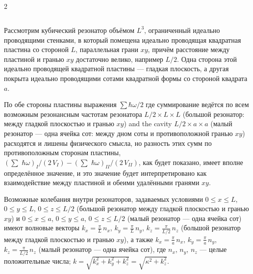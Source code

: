 \documentclass[twoside, 10pt]{article}
\def\myvspacebeforesubsection{-2.0mm}
\def\myvspaceaftersubsection{-2.5mm}
\begin{document}
\begin{multicols}{2}
\vspace{\myvspacebeforesubsection}
    \subsection*{} \label{two-dimensional-casimirs-approach}
\vspace{\myvspaceaftersubsection}


    Рассмотрим кубический резонатор объёмом \(L^3\), ограниченный идеально
проводящими стенками, в который помещена идеально проводящая квадратная пластина со стороной
\(L\), параллельная грани \(xy\), причём расстояние между пластиной и гранью \(xy\)
достаточно велико, например \(L/2\).
Одна сторона этой идеально проводящей квадратной пластины — гладкая плоскость, а
другая покрыта идеально проводящими сотами квадратной формы со стороной квадрата \(a\).

По обе стороны пластины выражения \(\sum\hbar\omega\big/2\)
где суммирование ведётся по всем возможным резонансным частотам резонатора \(L/2 \times L \times L\) (большой резонатор: между гладкой плоскостью и гранью \(xy\)) and the cavity \(L/2 \times a\times a\) (малый резонатор — одна ячейка сот: между дном соты и противоположной гранью \(xy\)) расходятся и лишены физического смысла, но разность этих сумм по противоположным сторонам пластины,
\(\left(\sum\,\,\hbar\omega\right)_{I}\big/{\left(2\,V_{I}\right)} - \left(\sum\,\,\hbar\omega\right)_{II}\big/{\left(2\,V_{II}\right)}\),
как будет показано, имеет вполне определённое значение, и это значение будет интерпретировано как взаимодействие между пластиной и обеими удалёнными гранями \(xy\).

    Возможные колебания внутри резонаторов, задаваемых условиями
\(0 \leq x \leq L\), \(0 \leq y \leq L\), \(0 \leq z \leq L/2\) (большой резонатор между гладкой плоскостью и гранью \(xy\))
и
\(0 \leq x \leq a\), \(0 \leq y \leq a\), \(0 \leq z \leq L/2\) (малый резонатор — одна ячейка сот) имеют волновые векторы
\(k_x = \frac{\pi}{L}\,n_x\), \(k_y = \frac{\pi}{L}\,n_y\),
\(k_z = \frac{\pi}{L/2}\,n_z\) (большой резонатор между гладкой плоскостью и гранью \(xy\)), а также
\(k_x = \frac{\pi}{a}\,n_x\), \(k_y = \frac{\pi}{a}\,n_y\),
\(k_z = \frac{\pi}{L/2}\,n_z\) (малый резонатор — одна ячейка сот),
где \(n_x\), \(n_y\), \(n_z\) — целые положительные числа;
    \(k = \sqrt{k_x^2+k_y^2+k_z^2} = \sqrt{\kappa^2+k_z^2}\).


\end{multicols}
\end{document}
